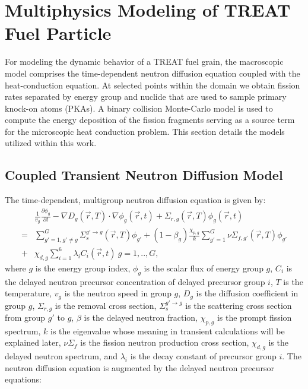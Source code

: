 \documentclass{anstrans}
\begin{document}
\section{Multiphysics Modeling of TREAT Fuel Particle}
For modeling the dynamic behavior of a TREAT fuel grain, the macroscopic model comprises the time-dependent neutron diffusion equation coupled with the heat-conduction equation. At selected points within the domain we obtain fission rates separated by energy group and nuclide that are used to sample primary knock-on atoms (PKAs). A binary collision Monte-Carlo model  is used to compute the energy deposition of the fission fragments serving as a source term for the microscopic heat conduction problem. This section details the models utilized within this work.

\subsection{Coupled Transient Neutron Diffusion Model}
The time-dependent, multigroup neutron diffusion equation is given by:
\begin{align}\label{eq:neutron_diffusion}
   &\frac{1}{v_g} \frac{\partial \phi_g}{\partial t} -\nabla D_g(\vec{r},T) \cdot \nabla \phi_g(\vec{r}, t) + \Sigma_{r,g}(\vec{r}, T) \phi_g(\vec{r}, t) \nonumber \\
   = &\sum\limits_{g'=1, g' \neq g}^G \Sigma_s^{g' \rightarrow g} (\vec{r},T) \phi_{g'}  
   +(1 - \beta_g) \frac{\chi_{p,g}}{k}\sum\limits_{g'=1}^G \nu \Sigma_{f,g'} (\vec{r},T) \phi_{g'} \nonumber \\
+& \chi_{d,g }\sum\limits_{i=1}^6  \lambda_i C_i(\vec{r}, t)~g=1,..,G,
\end{align}
where $g$ is the energy group index, $\phi_g$ is the scalar flux of energy group $g$, $C_i$ is the delayed neutron precursor concentration of delayed precursor group $i$, $T$ is the temperature, $v_g$ is the neutron speed in group $g$, $D_g$ is the diffusion coefficient in group $g$, $\Sigma_{r,g}$ is the removal cross section, $\Sigma_s^{g'\rightarrow g}$ is the scattering cross section from group $g'$ to $g$, $\beta$ is the delayed neutron fraction, $\chi_{p,g}$ is the prompt fission spectrum, $k$ is the eigenvalue whose meaning in transient calculations will be explained later, $\nu \Sigma_f$  is the fission neutron production cross section, $\chi_{d,g}$ is the delayed neutron spectrum, and $\lambda_i$ is the decay constant of precursor group $i$. The neutron diffusion equation  is augmented by the delayed neutron precursor equations:
\end{document}
